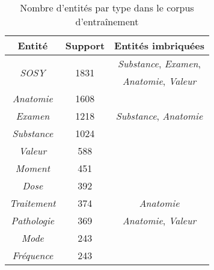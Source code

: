 \begin{wraptable}{r}{.5\textwidth}
    \centering
    \begin{adjustbox}{max width=\linewidth}
        \begin{tabular}{c|c|c}
            Entité                       & Support                     & Entités imbriquées                \\
            \hline
            \hline
            \multirow{2}{*}{\emph{SOSY}} & \multirow{2}{*}{\num{1831}} & \emph{Substance}, \emph{Examen},  \\
                                        &                             & \emph{Anatomie}, \emph{Valeur}    \\
            \emph{Anatomie}              & \num{1608}                  &                                   \\
            \emph{Examen}                & \num{1218}                  & \emph{Substance}, \emph{Anatomie} \\
            \emph{Substance}             & \num{1024}                  &                                   \\
            \emph{Valeur}                & \num{588}                   &                                   \\
            \emph{Moment}                & \num{451}                   &                                   \\
            \emph{Dose}                  & \num{392}                   &                                   \\
            \emph{Traitement}            & \num{374}                   & \emph{Anatomie}                   \\
            \emph{Pathologie}            & \num{369}                   & \emph{Anatomie}, \emph{Valeur}    \\
            \emph{Mode}                  & \num{243}                   &                                   \\
            \emph{Fréquence}             & \num{243}                   &                                   \\
        \end{tabular}
    \end{adjustbox}
    \caption{Nombre d'entités par type dans le corpus d'entraînement}
    \label{tab:tal:ent}
\end{wraptable}


